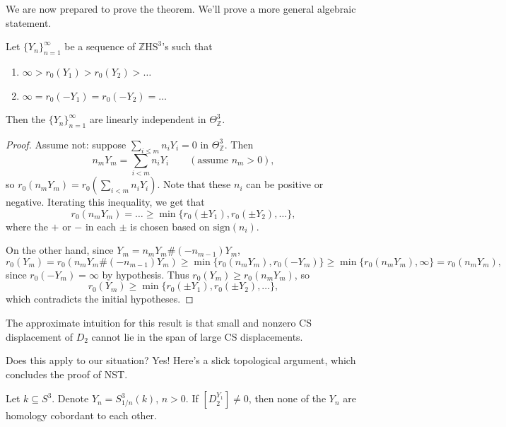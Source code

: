 \documentclass[main]{subfiles}
\begin{document}
We are now prepared to prove the theorem. We'll prove a more general algebraic statement.

\begin{theorem}
Let $\{Y_n\}_{n=1}^\infty$ be a sequence of $\mathbb{Z}\mathrm{HS}^3$'s such that
\begin{enumerate}
\item $\infty > r_0(Y_1) > r_0(Y_2) > \dots$
\item $\infty = r_0(-Y_1) = r_0(-Y_2) = \dots$
\end{enumerate}
Then the $\{Y_n\}_{n=1}^\infty$ are linearly independent in $\Theta^3_{\mathbb{Z}}$.
\end{theorem}

\begin{proof}
Assume not: suppose $\sum_{i\leq m} n_iY_i = 0$ in $\Theta^3_{\mathbb{Z}}$. Then
\[
n_mY_m = \sum_{i<m} n_iY_i \qquad (\text{assume } n_m>0),
\]
so $r_0(n_mY_m) = r_0\left(\sum_{i<m}n_iY_i\right)$. Note that these $n_i$ can be positive or negative. Iterating this inequality, we get that
\[
r_0(n_mY_m) = \dots \geq \min\{r_0(\pm Y_1), r_0(\pm Y_2), \dots\},
\]
where the $+$ or $-$ in each $\pm$ is chosen based on $\mathrm{sign}(n_i)$.

On the other hand, since $Y_m = n_mY_m \# (-n_{m-1})Y_m$,
\[
r_0(Y_m) = r_0\left(n_mY_m \# (-n_{m-1})Y_m\right) \geq \min\{r_0(n_mY_m), r_0(-Y_m)\} \geq \min\{r_0(n_mY_m), \infty\} = r_0(n_mY_m),
\]
since $r_0(-Y_m)=\infty$ by hypothesis. Thus $r_0(Y_m) \geq r_0(n_mY_m)$, so
\[
r_0(Y_m) \geq \min\{r_0(\pm Y_1), r_0(\pm Y_2), \dots\},
\]
which contradicts the initial hypotheses. \qedhere
\end{proof}

The approximate intuition for this result is that small and nonzero CS displacement of $D_2$ cannot lie in the span of large CS displacements.

Does this apply to our situation? Yes! Here's a slick topological argument, which concludes the proof of NST.

\begin{theorem*}
Let $k\subseteq S^3$. Denote $Y_n = S^3_{1/n}(k)$, $n>0$. If $[D_2^{Y_1}]\neq 0$, then none of the $Y_n$ are homology cobordant to each other.
\end{theorem*}
\end{document}
